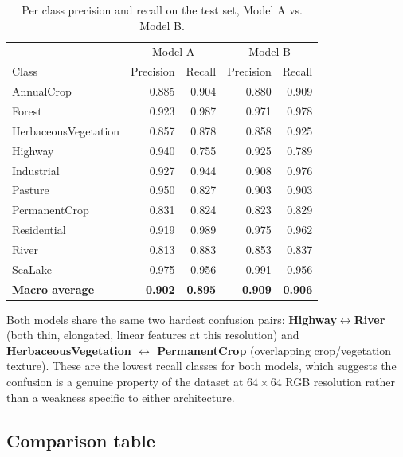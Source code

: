 \documentclass[11pt]{article}
\begin{document}
\begin{table}[H]
\centering
\caption{Per class precision and recall on the test set, Model A vs. Model B.}
\label{tab:per-class-ab}
\begin{tabular}{lrrrr}
\toprule
 & \multicolumn{2}{c}{Model A} & \multicolumn{2}{c}{Model B} \\
Class & Precision & Recall & Precision & Recall \\
\midrule
AnnualCrop            & 0.885 & 0.904 & 0.880 & 0.909 \\
Forest                & 0.923 & 0.987 & 0.971 & 0.978 \\
HerbaceousVegetation  & 0.857 & 0.878 & 0.858 & 0.925 \\
Highway               & 0.940 & 0.755 & 0.925 & 0.789 \\
Industrial            & 0.927 & 0.944 & 0.908 & 0.976 \\
Pasture               & 0.950 & 0.827 & 0.903 & 0.903 \\
PermanentCrop         & 0.831 & 0.824 & 0.823 & 0.829 \\
Residential           & 0.919 & 0.989 & 0.975 & 0.962 \\
River                 & 0.813 & 0.883 & 0.853 & 0.837 \\
SeaLake               & 0.975 & 0.956 & 0.991 & 0.956 \\
\midrule
\textbf{Macro average} & \textbf{0.902} & \textbf{0.895} & \textbf{0.909} & \textbf{0.906} \\
\bottomrule
\end{tabular}
\end{table}

Both models share the same two hardest confusion pairs:
\textbf{Highway$\leftrightarrow$River} (both thin, elongated, linear
features at this resolution) and \textbf{HerbaceousVegetation
$\leftrightarrow$ PermanentCrop} (overlapping crop/vegetation texture). These
are the lowest recall classes for both models, which suggests the confusion
is a genuine property of the dataset at $64\times64$ RGB resolution rather
than a weakness specific to either architecture.

\subsection{Comparison table}
\end{document}
